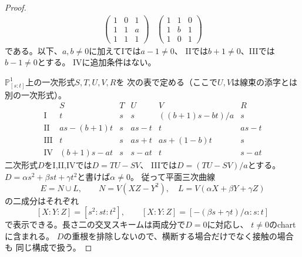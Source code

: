 \begin{proof}
\[\begin{array}{c|ccc}
\begin{pmatrix}1&0&1\\1&1&a\\1&1&1\end{pmatrix}&
\begin{pmatrix}1&1&0\\1&b&1\\1&0&1\end{pmatrix}
\end{array}
\]
である。以下、$a,b\ne0$に加えてIでは$a-1\ne0$、
IIでは$b+1\ne0$、IIIでは$b-1\ne0$とする。
IVに追加条件はない。

$\mathbb P^1_{[s:t]}$上の一次形式$S,T,U,V,R$を
次の表で定める（ここで$U,V$は線束の添字とは別の一次形式）。
\[
\begin{array}{c|ccccc}
 &S&T&U&V&R\\ \hline
\mathrm{I}&t&s&s&((b+1)s-bt)/a&s\\
\mathrm{II}&as-(b+1)t&s&as-t&t&as-t\\
\mathrm{III}&t&s&as+t&as+(1-b)t&s\\
\mathrm{IV}&(b+1)s-at&s&s-at&t&s-at
\end{array}
\]
二次形式$D$をI,II,IVでは$D=TU-SV$、
IIIでは$D=(TU-SV)/a$とする。
$D=\alpha s^2+\beta st+\gamma t^2$と書けば$\alpha\ne0$。
従って平面三次曲線
\[
 E=N\cup L,\qquad N=V(XZ-Y^2),\quad
 L=V(\alpha X+\beta Y+\gamma Z)
\]
の二成分はそれぞれ
\[
 [X:Y:Z]=[s^2:st:t^2],\qquad
 [X:Y:Z]=[-(\beta s+\gamma t)/\alpha:s:t]
\]
で表示できる。長さ二の交叉スキームは両成分で$D=0$に対応し、
$t\ne0$のchartに含まれる。
$D$の重根を排除しないので、横断する場合だけでなく接触の場合も
同じ構成で扱う。


\end{proof}
